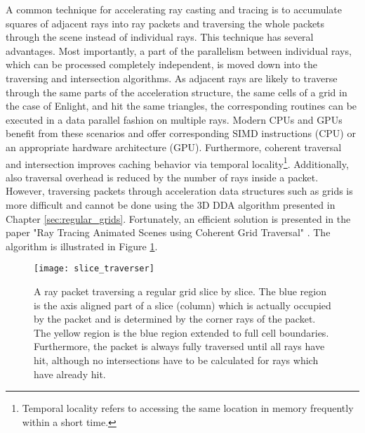 A common technique for accelerating ray casting and tracing is to accumulate squares of adjacent rays into ray packets and traversing the whole packets through the scene instead of individual rays. This technique has several advantages. Most importantly, a part of the parallelism between individual rays, which can be processed completely independent, is moved down into the traversing and intersection algorithms. As adjacent rays are likely to traverse through the same parts of the acceleration structure, the same cells of a grid in the case of Enlight, and hit the same triangles, the corresponding routines can be executed in a data parallel fashion on multiple rays. Modern CPUs and GPUs benefit from these scenarios and offer corresponding SIMD instructions (CPU) or an appropriate hardware architecture (GPU). Furthermore, coherent traversal and intersection improves caching behavior via temporal locality\footnote{Temporal locality refers to accessing the same location in memory frequently within a short time.}. Additionally, also traversal overhead is reduced by the number of rays inside a packet. However, traversing packets through acceleration data structures such as grids is more difficult and cannot be done using the 3D DDA algorithm presented in Chapter \ref{sec:regular_grids}. Fortunately, an efficient solution is presented in the paper "Ray Tracing Animated Scenes using Coherent Grid Traversal" \cite{packet_caster}. The algorithm is illustrated in Figure \ref{fig:slice_traverser}.

\begin{figure}[h]
\centering
\texttt{[image: slice\_traverser]}
\caption[A ray packet traversing a regular grid slice by slice.]{A ray packet traversing a regular grid slice by slice. The blue region is the axis aligned part of a slice (column) which is actually occupied by the packet and is determined by the corner rays of the packet. The yellow region is the blue region extended to full cell boundaries. Furthermore, the packet is always fully traversed until all rays have hit, although no intersections have to be calculated for rays which have already hit.}
\label{fig:slice_traverser} 
\end{figure}

